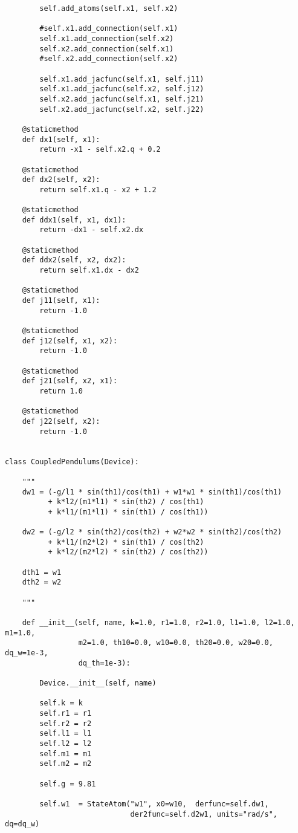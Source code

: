 \begin{lstlisting}
        self.add_atoms(self.x1, self.x2)

        #self.x1.add_connection(self.x1)
        self.x1.add_connection(self.x2)
        self.x2.add_connection(self.x1)
        #self.x2.add_connection(self.x2)

        self.x1.add_jacfunc(self.x1, self.j11)
        self.x1.add_jacfunc(self.x2, self.j12)
        self.x2.add_jacfunc(self.x1, self.j21)
        self.x2.add_jacfunc(self.x2, self.j22)

    @staticmethod
    def dx1(self, x1):
        return -x1 - self.x2.q + 0.2

    @staticmethod
    def dx2(self, x2):
        return self.x1.q - x2 + 1.2

    @staticmethod
    def ddx1(self, x1, dx1):
        return -dx1 - self.x2.dx

    @staticmethod
    def ddx2(self, x2, dx2):
        return self.x1.dx - dx2

    @staticmethod
    def j11(self, x1):
        return -1.0

    @staticmethod
    def j12(self, x1, x2):
        return -1.0

    @staticmethod
    def j21(self, x2, x1):
        return 1.0

    @staticmethod
    def j22(self, x2):
        return -1.0


class CoupledPendulums(Device):

    """
    dw1 = (-g/l1 * sin(th1)/cos(th1) + w1*w1 * sin(th1)/cos(th1)
          + k*l2/(m1*l1) * sin(th2) / cos(th1)
          + k*l1/(m1*l1) * sin(th1) / cos(th1))

    dw2 = (-g/l2 * sin(th2)/cos(th2) + w2*w2 * sin(th2)/cos(th2)
          + k*l1/(m2*l2) * sin(th1) / cos(th2)
          + k*l2/(m2*l2) * sin(th2) / cos(th2))

    dth1 = w1
    dth2 = w2

    """

    def __init__(self, name, k=1.0, r1=1.0, r2=1.0, l1=1.0, l2=1.0, m1=1.0,
                 m2=1.0, th10=0.0, w10=0.0, th20=0.0, w20=0.0, dq_w=1e-3,
                 dq_th=1e-3):

        Device.__init__(self, name)

        self.k = k
        self.r1 = r1
        self.r2 = r2
        self.l1 = l1
        self.l2 = l2
        self.m1 = m1
        self.m2 = m2

        self.g = 9.81

        self.w1  = StateAtom("w1", x0=w10,  derfunc=self.dw1,
                             der2func=self.d2w1, units="rad/s", dq=dq_w)



\end{lstlisting}
